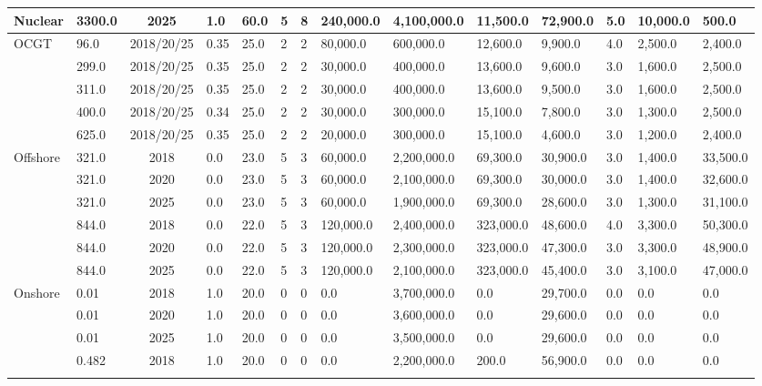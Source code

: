 \begin{table*}[]
\begin{tabularx}{\linewidth}{|p{}|l|c|l|l|l|l|l|l|l|l|l|l|l|}
Nuclear & 3300.0 & 2025 & 1.0 & 60.0 & 5 & 8 & 240,000.0 & 4,100,000.0 & 11,500.0 & 72,900.0 & 5.0 & 10,000.0 & 500.0 \\ \hline
\multirow{5}{*}{OCGT} & 96.0 & 2018/20/25 & 0.35 & 25.0 & 2 & 2 & 80,000.0 & 600,000.0 & 12,600.0 & 9,900.0 & 4.0 & 2,500.0 & 2,400.0 \\ \cline{2-14} 
& 299.0 & 2018/20/25 & 0.35 & 25.0 & 2 & 2 & 30,000.0 & 400,000.0 & 13,600.0 & 9,600.0 & 3.0 & 1,600.0 & 2,500.0 \\ \cline{2-14} 
& 311.0 & 2018/20/25 & 0.35 & 25.0 & 2 & 2 & 30,000.0 & 400,000.0 & 13,600.0 & 9,500.0 & 3.0 & 1,600.0 & 2,500.0 \\ \cline{2-14} 
& 400.0 & 2018/20/25 & 0.34 & 25.0 & 2 & 2 & 30,000.0 & 300,000.0 & 15,100.0 & 7,800.0 & 3.0 & 1,300.0 & 2,500.0 \\ \cline{2-14} 
& 625.0 & 2018/20/25 & 0.35 & 25.0 & 2 & 2 & 20,000.0 & 300,000.0 & 15,100.0 & 4,600.0 & 3.0 & 1,200.0 & 2,400.0 \\ \hline
\multirow{6}{*}{Offshore} & 321.0 & 2018 & 0.0 & 23.0 & 5 & 3 & 60,000.0 & 2,200,000.0 & 69,300.0 & 30,900.0 & 3.0 & 1,400.0 & 33,500.0 \\ \cline{2-14} 
& 321.0 & 2020 & 0.0 & 23.0 & 5 & 3 & 60,000.0 & 2,100,000.0 & 69,300.0 & 30,000.0 & 3.0 & 1,400.0 & 32,600.0 \\ \cline{2-14} 
& 321.0 & 2025 & 0.0 & 23.0 & 5 & 3 & 60,000.0 & 1,900,000.0 & 69,300.0 & 28,600.0 & 3.0 & 1,300.0 & 31,100.0 \\ \cline{2-14} 
& 844.0 & 2018 & 0.0 & 22.0 & 5 & 3 & 120,000.0 & 2,400,000.0 & 323,000.0 & 48,600.0 & 4.0 & 3,300.0 & 50,300.0 \\ \cline{2-14} 
& 844.0 & 2020 & 0.0 & 22.0 & 5 & 3 & 120,000.0 & 2,300,000.0 & 323,000.0 & 47,300.0 & 3.0 & 3,300.0 & 48,900.0 \\ \cline{2-14} 
& 844.0 & 2025 & 0.0 & 22.0 & 5 & 3 & 120,000.0 & 2,100,000.0 & 323,000.0 & 45,400.0 & 3.0 & 3,100.0 & 47,000.0 \\ \hline
\multirow{9}{*}{Onshore} & 0.01 & 2018 & 1.0 & 20.0 & 0 & 0 & 0.0 & 3,700,000.0 & 0.0 & 29,700.0 & 0.0 & 0.0 & 0.0 \\ \cline{2-14} 
& 0.01 & 2020 & 1.0 & 20.0 & 0 & 0 & 0.0 & 3,600,000.0 & 0.0 & 29,600.0 & 0.0 & 0.0 & 0.0 \\ \cline{2-14} 
& 0.01 & 2025 & 1.0 & 20.0 & 0 & 0 & 0.0 & 3,500,000.0 & 0.0 & 29,600.0 & 0.0 & 0.0 & 0.0 \\ \cline{2-14} 
& 0.482 & 2018 & 1.0 & 20.0 & 0 & 0 & 0.0 & 2,200,000.0 & 200.0 & 56,900.0 & 0.0 & 0.0 & 0.0 \\ \cline{2-14} 

\end{tabularx}
\end{table*}
